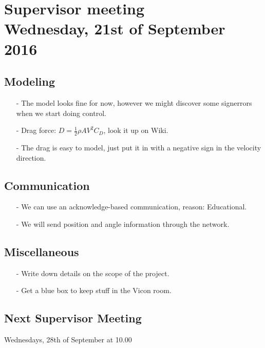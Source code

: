
\renewcommand{\vec}[1]{\boldsymbol{\mathbf{#1}}}

\renewcommand\chaptername{KAPITEL}
\renewcommand\contentsname{Indhold}
\renewcommand\figurename{Figur}
\renewcommand\tablename{Tabel}

\section*{Supervisor meeting\\ \small Wednesday, 21st of September 2016}

\subsection{Modeling}
\begin{itemize}
  \item[-] The model looks fine for now, however we might discover some signerrors when we start doing control.
  \item[-] Drag force: $D = \frac{1}{2} \rho A V^2 C_D$, look it up on Wiki.
  \item[-] The drag is easy to model, just put it in with a negative sign in the velocity direction.
\end{itemize}

\subsection{Communication}
\begin{itemize}
  \item[-] We can use an acknowledge-based communication, reason: Educational.
  \item[-] We will send position and angle information through the network.
\end{itemize}

\subsection{Miscellaneous}
\begin{itemize}
  \item[-] Write down details on the scope of the project.
  \item[-] Get a blue box to keep stuff in the Vicon room.
\end{itemize}

\subsection{Next Supervisor Meeting}
Wednesdays, 28th of September at 10.00

